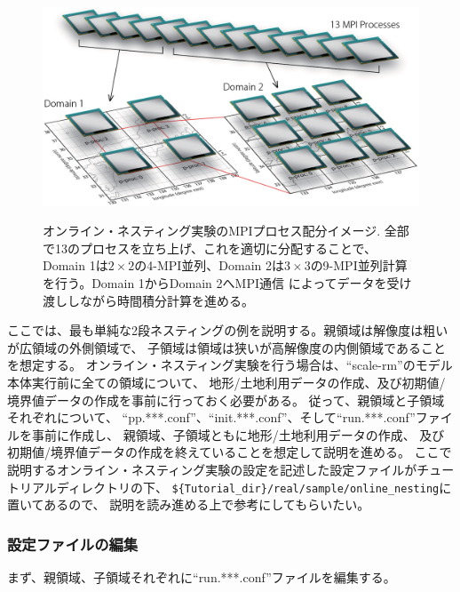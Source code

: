 \begin{figure}[t]
\begin{center}
  \includegraphics[width=0.8\hsize]{./figure/mpisplit_nesting.eps}\\
  \caption{オンライン・ネスティング実験のMPIプロセス配分イメージ. 全部で13のプロセスを立ち上げ、これを適切に分配することで、
           Domain 1は$2 \times 2$の4-MPI並列、Domain 2は$3 \times 3$の9-MPI並列計算を行う。Domain 1からDomain 2へMPI通信
           によってデータを受け渡ししながら時間積分計算を進める。}
  \label{fig_mpisplit}
\end{center}
\end{figure}


ここでは、最も単純な2段ネスティングの例を説明する。親領域は解像度は粗いが広領域の外側領域で、
子領域は領域は狭いが高解像度の内側領域であることを想定する。
オンライン・ネスティング実験を行う場合は、``scale-rm''のモデル本体実行前に全ての領域について、
地形/土地利用データの作成、及び初期値/境界値データの作成を事前に行っておく必要がある。
従って、親領域と子領域それぞれについて、
``pp.***.conf''、``init.***.conf''、そして``run.***.conf''ファイルを事前に作成し、
親領域、子領域ともに地形/土地利用データの作成、
及び初期値/境界値データの作成を終えていることを想定して説明を進める。
ここで説明するオンライン・ネスティング実験の設定を記述した設定ファイルがチュートリアルディレクトリの下、
\verb|${Tutorial_dir}/real/sample/online_nesting|に置いてあるので、
説明を読み進める上で参考にしてもらいたい。


\subsubsection{設定ファイルの編集}
まず、親領域、子領域それぞれに``run.***.conf''ファイルを編集する。

